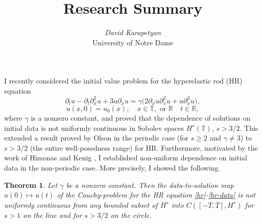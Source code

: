 \documentclass[12pt,reqno]{amsart}
\newcommand{\rr}{\mathbb{R}}
\newcommand{\p}{\partial}
\newcommand{\ci}{\mathbb{T}}
\theoremstyle{plain}  %
\newtheorem{theorem}{Theorem}
\theoremstyle{definition}
\begin{document}
%
%
%
%
\title{Research Summary} 
\author{{\it David Karapetyan}\\
University of Notre Dame}
\maketitle




{}
\parindent0in
\parskip0.1in
%
%
\setcounter{equation}{0}
%
I recently considered the initial value problem for
the hyperelastic rod (HR) equation
%
%
\begin{equation}
\label{hr}
\p_t u
-
\p_t \p_x^2 u
+
3u\p_x u
=
\gamma \big (
2\p_x u \p_x^2 u
+
u \p_x^3 u
\big ),
\end{equation}
%
%
%
%
\begin{equation}
\label{hr-data} u(x, 0) = u_0 (x),
\quad x  \in \ci, \text{  or  } \rr \quad t \in \rr,
\end{equation}
%
%
where  $\gamma$  is a  nonzero constant,
and proved that the dependence of solutions on initial data is not uniformly 
continuous in Sobolev spaces $H^s(\ci)$, $s>3/2$.
This extended a result proved by Olson 
\cite{Olson_2006_Non-uniform-dep} in the periodic
case (for $s\ge 2$ and $\gamma \ne 3$)  to  $s>3/2$ (the entire 
well-posedness range)
for HR. Furthermore,  motivated by the work of
Himonas  and Kenig \cite{Himonas_2009_Non-uniform-dep},
I established non-uniform dependence on initial data
in the non-periodic case. More precisely, I showed the following. 
%
%
\begin{theorem}
\label{hr-non-unif-dependence}
Let $\gamma$ be a nonzero constant. Then 
the data-to-solution map $u(0) \mapsto u(t)$ of the Cauchy-problem
for the HR equation
\eqref{hr}-\eqref{hr-data}
is not uniformly continuous
from any bounded subset of  $H^s$ into $C([-T, T], H^s)$
for $s>1$ on the line  and for $s>3/2$ on the circle.
%
\end{theorem}
\end{document}
